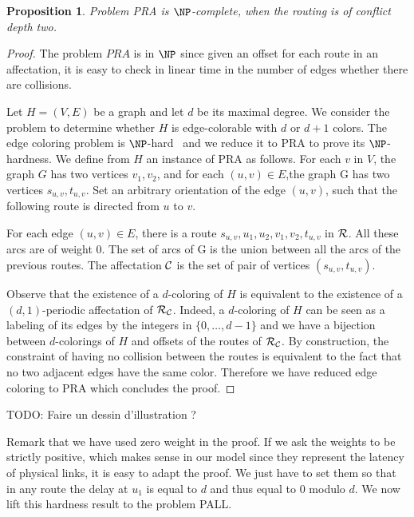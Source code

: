 \documentclass[a4paper,10pt]{article}
\newtheorem{proposition}{Proposition}
\newcommand{\todo}[1]{{\color{red} TODO: {#1}}}
\begin{document}
 \begin{proposition}
Problem PRA is $\NP$-complete, when the routing is of conflict depth two.
\end{proposition}
 \begin{proof}
 The problem $PRA$ is in $\NP$ since given an offset for each route in an affectation, it is easy to check in linear time in the number of edges whether there are collisions.
 
  Let $H=(V,E)$ be a graph and let $d$ be its maximal degree. We consider the problem to determine whether $H$ is edge-colorable
  with $d$ or $d+1$ colors. The edge coloring problem is $\NP$-hard~\cite{holyer1981np} and we reduce it to PRA to prove its $\NP$-hardness. We define from $H$ an instance of PRA as follows. 
  For each $v$ in $V$, the graph $G$ has two vertices $v_1, v_2$, and for each $(u,v) \in E$,the graph G has two vertices $s_{u,v}, t_{u,v}$. Set an arbitrary orientation of the edge $(u,v)$, such that the following route is directed from $u$ to $v$.
  
  For each edge $(u,v) \in E$, there is a route $s_{u,v},u_1,u_2,v_1,v_2,t_{u,v}$ in ${\cal R}$.  
  All these arcs are of weight $0$. 
  The set of arcs of G is the union between all the arcs of the previous routes.
  The affectation ${\cal C}$ is the set of pair of vertices $(s_{u,v}, t_{u,v})$.
   
    
  Observe that the existence of a $d$-coloring of $H$ is equivalent to the existence of a $(d,1)$-periodic affectation
  of ${\cal R}_{\cal C}$. Indeed, a $d$-coloring of $H$ can be seen as a labeling of its edges by the integers
  in $\{0,\dots,d-1\}$ and we have a bijection between $d$-colorings of $H$ and offsets of the routes of ${\cal R}_{\cal C}$.
  By construction, the constraint of having no collision between the routes is equivalent to the fact that no two adjacent edges have
  the same color. Therefore we have reduced edge coloring to PRA which concludes the proof. 
 \end{proof}
 \todo{Faire un dessin d'illustration ?}
 
 Remark that we have used zero weight in the proof. If we ask the weights to be strictly positive, which makes sense in our model since
they represent the latency of physical links, it is easy to adapt the proof. We just have to set them so that in any route the delay at $u_1$ is equal to $d$ and thus equal to $0$ modulo $d$. We now lift this hardness result to the problem PALL.
\end{document}
